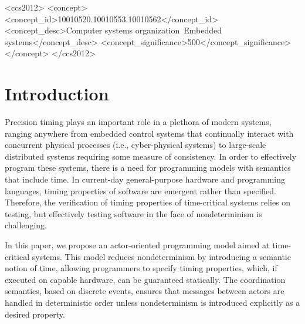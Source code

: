 \documentclass[sigconf]{acmart}
\begin{document}
%
%
\begin{CCSXML}
	<ccs2012>
	<concept>
	<concept_id>10010520.10010553.10010562</concept_id>
	<concept_desc>Computer systems organization~Embedded systems</concept_desc>
	<concept_significance>500</concept_significance>
	</concept>
	</ccs2012>  
\end{CCSXML}




\maketitle

\section{Introduction}\label{sec:intro}
Precision timing plays an important role in a plethora of modern systems, ranging anywhere from embedded control systems that continually interact with concurrent physical processes (i.e., cyber-physical systems) to large-scale distributed systems requiring some measure of consistency.
In order to effectively program these systems, there is a need for programming models with semantics that include time.
In current-day general-purpose hardware and programming languages, timing properties of software are emergent rather than specified.
Therefore, the verification of timing properties of time-critical systems relies on testing, but effectively testing software in the face of nondeterminism is challenging.

In this paper, we propose an actor-oriented programming model aimed at time-critical systems. This model reduces nondeterminism by introducing a semantic notion of time, allowing programmers to specify timing properties, which, if executed on capable hardware, can be guaranteed statically. The coordination semantics, based on discrete events, ensures that messages between actors are handled in deterministic order unless nondeterminism is introduced explicitly as a desired property.
\end{document}
